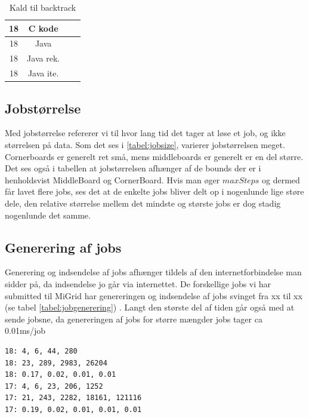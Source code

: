 \begin{table}
\begin{center}
\begin{tabular}{|c|c|c|c|}
\hline
\hline 18 & C kode        &             &             \\
\hline 18 & Java          &             &             \\
\hline 18 & Java rek. &             &             \\
\hline 18 & Java ite. &             &             \\
\hline
\end{tabular}
\caption{Kald til backtrack}
\label{table:backtrackkald}
\end{center}
\end{table}

\subsection{Jobstørrelse}

Med jobstørrelse refererer vi til hvor lang tid det tager at løse et job, og
ikke størrelsen på data. 
Som det ses i \ref{tabel:jobsize}, varierer jobstørrelsen
meget. Cornerboards er generelt ret små, mens middleboards er generelt er en del
større. Det ses også i tabellen at jobstørrelsen afhænger af de bounds der er i
henholdsvist MiddleBoard og CornerBoard. Hvis man øger $maxSteps$ og dermed får
lavet flere jobs, ses det at de enkelte jobs bliver delt op i nogenlunde lige
støre dele, den relative størrelse mellem det mindste og største jobs er dog
stadig nogenlunde det samme. 

\subsection{Generering af jobs}

Generering og indsendelse af jobs afhænger tildels af den internetforbindelse
man sidder på, da indsendelse jo går via internettet. De forskellige jobs vi har
submitted til MiGrid har genereringen og indsendelse af jobs svinget fra xx til
xx (se tabel \ref{tabel:jobgenerering}) . Langt den største del af tiden går også med at sende jobsne,
da genereringen af jobs for større mængder jobs tager ca 0.01ms/job
\begin{verbatim}
18: 4, 6, 44, 280
18: 23, 289, 2983, 26204
18: 0.17, 0.02, 0.01, 0.01
17: 4, 6, 23, 206, 1252
17: 21, 243, 2282, 18161, 121116
17: 0.19, 0.02, 0.01, 0.01, 0.01
\end{verbatim}
